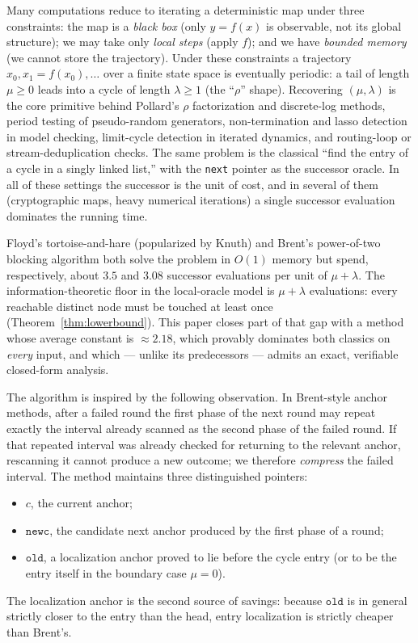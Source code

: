 \documentclass[11pt]{article}
\newcommand{\nextop}{\texttt{next}}
\newcommand{\oldc}{\texttt{old}}
\newcommand{\newc}{\texttt{newc}}
\begin{document}
Many computations reduce to iterating a deterministic map under three
constraints: the map is a \emph{black box} (only $y=f(x)$ is observable, not its
global structure); we may take only \emph{local steps} (apply $f$); and we have
\emph{bounded memory} (we cannot store the trajectory). Under these constraints a
trajectory $x_0,x_1=f(x_0),\dots$ over a finite state space is eventually
periodic: a tail of length $\mu\ge 0$ leads into a cycle of length $\lambda\ge 1$
(the ``$\rho$'' shape). Recovering $(\mu,\lambda)$ is the core primitive behind
Pollard's $\rho$ factorization and discrete-log methods, period testing of
pseudo-random generators, non-termination and lasso detection in model checking,
limit-cycle detection in iterated dynamics, and routing-loop or
stream-deduplication checks. The same problem is the classical ``find the entry
of a cycle in a singly linked list,'' with the \nextop{} pointer as the
successor oracle. In all of these settings the successor is the unit of cost, and
in several of them (cryptographic maps, heavy numerical iterations) a single
successor evaluation dominates the running time.

Floyd's tortoise-and-hare (popularized by Knuth) and Brent's power-of-two
blocking algorithm both solve the problem in $O(1)$ memory but spend,
respectively, about $3.5$ and $3.08$ successor evaluations per unit of
$\mu+\lambda$. The information-theoretic floor in the local-oracle model is
$\mu+\lambda$ evaluations: every reachable distinct node must be touched at least
once (Theorem~\ref{thm:lowerbound}). This paper closes part of that gap with a
method whose average constant is $\approx 2.18$, which provably dominates both
classics on \emph{every} input, and which --- unlike its predecessors --- admits
an exact, verifiable closed-form analysis.

The algorithm is inspired by the following observation. In Brent-style anchor
methods, after a failed round the first phase of the next round may repeat
exactly the interval already scanned as the second phase of the failed round. If
that repeated interval was already checked for returning to the relevant anchor,
rescanning it cannot produce a new outcome; we therefore \emph{compress} the
failed interval. The method maintains three distinguished pointers:
\begin{itemize}[leftmargin=2em]
    \item $c$, the current anchor;
    \item $\newc$, the candidate next anchor produced by the first phase of a round;
    \item $\oldc$, a localization anchor proved to lie before the cycle entry
          (or to be the entry itself in the boundary case $\mu=0$).
\end{itemize}
The localization anchor is the second source of savings: because $\oldc$ is in
general strictly closer to the entry than the head, entry localization is
strictly cheaper than Brent's.
\end{document}

